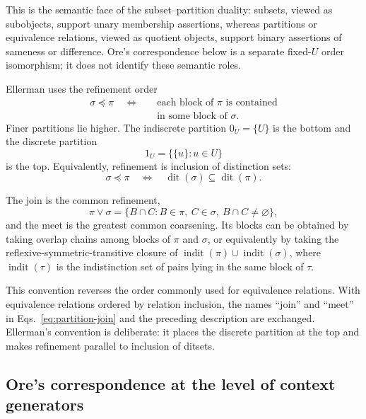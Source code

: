 \documentclass[aps,pra,reprint,nofootinbib]{revtex4-2}
\newcommand{\dit}{\operatorname{dit}}
\newcommand{\indit}{\operatorname{indit}}
\begin{document}
This is the semantic face of the subset--partition duality: subsets, viewed as
subobjects, support unary membership assertions, whereas partitions or
equivalence relations, viewed as quotient objects, support binary assertions
  of sameness or difference.  Ore's
correspondence below is a separate fixed-$U$ order isomorphism; it does not
identify these semantic roles.

Ellerman uses the refinement order
\begin{equation}
  \begin{split}
  \sigma\preceq\pi\quad\Longleftrightarrow\quad
  &\text{each block of $\pi$ is contained}\\
  &\text{in some block of $\sigma$}.
  \end{split}
  \label{eq:refinement}
\end{equation}
Finer partitions lie higher.  The indiscrete partition $0_U=\{U\}$ is the
bottom and the discrete partition
\begin{equation}
  1_U=\bigl\{\{u\}:u\in U\bigr\}
\end{equation}
is the top.  Equivalently, refinement is inclusion of distinction sets:
\begin{equation}
  \sigma\preceq\pi
  \quad\Longleftrightarrow\quad
  \dit(\sigma)\subseteq\dit(\pi).
  \label{eq:dit-refinement}
\end{equation}

The join is the common refinement,
\begin{equation}
  \pi\vee\sigma=
  \{B\cap C:B\in\pi,\ C\in\sigma,\ B\cap C\ne\varnothing\},
  \label{eq:partition-join}
\end{equation}
and the meet is the greatest common coarsening.  Its blocks can be obtained by
taking overlap chains among blocks of $\pi$ and $\sigma$, or equivalently by
taking the reflexive-symmetric-transitive closure of
$\indit(\pi)\cup\indit(\sigma)$, where $\indit(\tau)$ is the indistinction set
of pairs lying in the same block of $\tau$.

This convention reverses the order commonly used for equivalence relations.
With equivalence relations ordered by relation inclusion, the names ``join''
and ``meet'' in Eqs.~\eqref{eq:partition-join} and the preceding description
are exchanged.  Ellerman's convention is deliberate: it places the discrete
partition at the top and makes refinement parallel to inclusion of ditsets.

\subsection{Ore's correspondence at the level of context generators}
\end{document}
